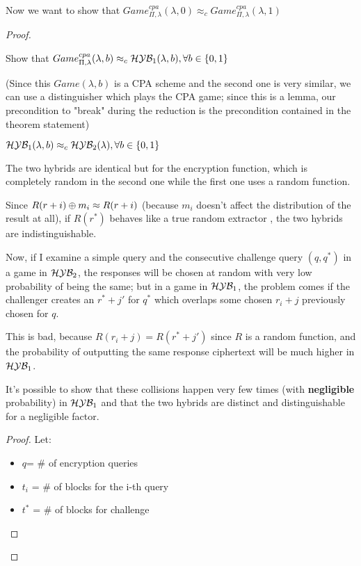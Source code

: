 Now we want to show that $Game_{\Pi, \lambda}^{cpa}(\lambda,0)
\approx_{c}Game_{\Pi, \lambda}^{cpa}(\lambda,1) $
\begin{proof}

    \begin{exercise}
        \begin{lemma}
        Show that $Game_{\Pi, \lambda}^{cpa}(\lambda,b) \approx_{c} \mathcal{H}\mathcal{Y}\mathcal{B}_{1}
        (\lambda, b), \forall b \in \{0,1\} $
        \end{lemma}

        (Since this $Game(\lambda, b)$ is a CPA scheme and the second one is        very similar, we can use a distinguisher which plays the CPA game; since this is a lemma, our precondition to "break" during the reduction is the precondition contained in the theorem statement)
    \end{exercise}

    \begin{lemma}
        $\mathcal{H}\mathcal{Y}\mathcal{B}_{1}(\lambda,b) \approx_{c} \mathcal{H}\mathcal{Y}\mathcal{B}_{2} (\lambda), \forall b \in
        \{0,1\}$
    \end{lemma}

    The two hybrids are identical but for the encryption function, which is completely random in the second one while the first one uses a random function.
    
    Since  $R(r + i ) \oplus m_{i} \approx R(r + i ) $ (because $m_{i}$ doesn't affect the distribution of the result at all), if  $R(r^{*})$ behaves like a true random extractor , the two hybrids are indistinguishable.

    Now, if I examine a simple query and the consecutive challenge query $(q, q^{*})$ in a game in $\mathcal{H}\mathcal{Y}\mathcal{B}_{2}$, the responses will be chosen at random with very low probability of being the same; but in a game in $\mathcal{H}\mathcal{Y}\mathcal{B}_{1}$, the problem comes if the challenger creates an $r^{*}+ j'$ for $q^{*}$ which overlaps some chosen $r_{i} + j$ previously chosen for $q$.

    This is bad, because $R(r_{i} + j)=R(r^{*} + j')$ since $R$ is a random function, and the probability of outputting the same response ciphertext will be much higher in $\mathcal{H}\mathcal{Y}\mathcal{B}_{1}$.

    It's possible to show that these collisions happen very few times (with \textbf{negligible} probability) in $\mathcal{H}\mathcal{Y}\mathcal{B}_{1}$ and  that the two hybrids are distinct and distinguishable for a negligible factor.

    \begin{proof}
        Let:
        \begin{itemize}
            \item $q$= \# of encryption queries
            \item $t_{i}$ = \# of blocks for the i-th query
            \item $t^{*}$ = \# of blocks for challenge
        \end{itemize}


\end{proof}
\end{proof}
